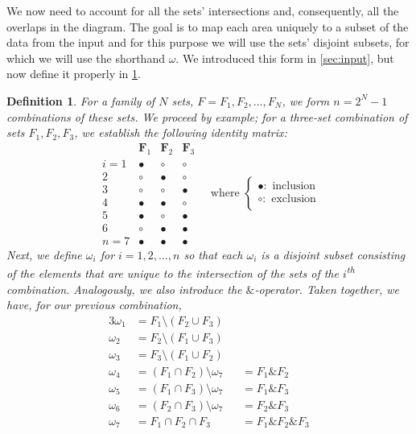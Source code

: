 \documentclass[
  oneside,
  openany,
  numbers=noendperiod,
  parskip=half,
  bibliography=totoc
]{scrbook}\usepackage[]{graphicx}\usepackage{xcolor}
\newtheorem{mydef}{Definition}[chapter]
\begin{document}
We now need to account for all the sets' intersections and, consequently,
all the overlaps in the diagram. The goal is to map each area uniquely
to a subset of the data from the input and for this purpose we will
use the sets' disjoint subsets, for which we will use the shorthand $\omega$. We introduced this
form in \cref{sec:input}, but now define it properly in \cref{def:omega}.

\begin{mydef}
\label{def:omega}
For a family of $N$ sets, $F = F_1, F_2, \dots, F_N$, we form $n=2^N-1$
combinations of these sets. We proceed by example; for a three-set combination
of sets $F_1,F_2,F_3$, we establish the following identity matrix:
\begin{equation*}
  \begin{array}{r|ccc}
    &\bm{F}_1  & \bm{F}_2  & \bm{F}_3\\
    i=1&\bullet & \circ   & \circ\\
    2&\circ   & \bullet & \circ \\
    3&\circ   & \circ   & \bullet \\
    4&\bullet & \bullet & \circ\\
    5&\bullet & \circ   & \bullet\\
    6&\circ   & \bullet & \bullet\\
    n=7&\bullet & \bullet & \bullet
  \end{array} \quad\text{where } \begin{cases}
                                    \bullet : \text{ inclusion}\\
                                    \circ   : \text{ exclusion}\\
                                  \end{cases}
\end{equation*}
Next, we define $\omega_i$ for $i = 1,2,\dots,n$ so that
each $\omega_i$ is a disjoint subset consisting of the elements that are
\emph{unique} to the intersection of
the sets of the $i$\textsuperscript{th} combination. Analogously,
we also introduce the $\&$-operator. Taken together, we have, for our previous
combination,
\begin{alignat*}{3}
  \omega_1 & = F_1 \setminus (F_2 \cup F_3)&&\\
  \omega_2 & = F_2 \setminus (F_1 \cup F_3)&&\\
  \omega_3 & = F_3 \setminus (F_1 \cup F_2)&&\\
  \omega_4 & = (F_1 \cap F_2) \setminus \omega_7 && = F_1 \& F_2\\
  \omega_5 & = (F_1 \cap F_3) \setminus \omega_7 && = F_1 \& F_3\\
  \omega_6 & = (F_2 \cap F_3) \setminus \omega_7 && = F_2 \& F_3\\
  \omega_7 & = F_1 \cap F_2 \cap F_3 && = F_1 \& F_2 \& F_3
\end{alignat*}
\end{mydef}
\end{document}

